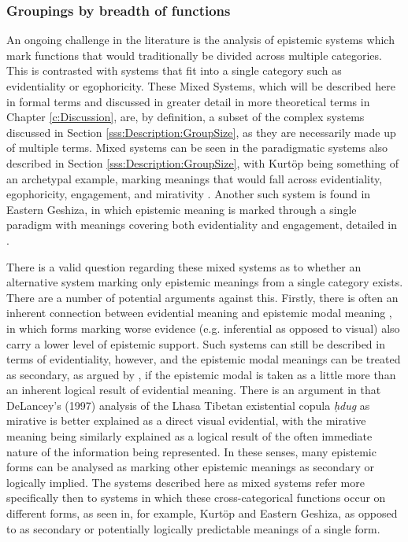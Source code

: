 \subsubsection{Groupings by breadth of functions}\label{sss:Description:MixedSystems}
An ongoing challenge in the literature is the analysis of epistemic systems which mark functions that would traditionally be divided across multiple categories. This is contrasted with systems that fit into a single category such as evidentiality or egophoricity. These Mixed Systems, which will be described here in formal terms and discussed in greater detail in more theoretical terms in Chapter \ref{c:Discussion}, are, by definition, a subset of the complex systems discussed in Section \ref{sss:Description:GroupSize}, as they are necessarily made up of multiple terms. Mixed systems can be seen in the paradigmatic systems also described in Section \ref{sss:Description:GroupSize}, with Kurtöp being something of an archetypal example, marking meanings that would fall across evidentiality, egophoricity, engagement, and mirativity \cite{Hyslop2020Kurtop}. Another such system is found in Eastern Geshiza, in which epistemic meaning is marked through a single paradigm with meanings covering both evidentiality and engagement, detailed in . 

There is a valid question regarding these mixed systems as to whether an alternative system marking only epistemic meanings from a single category exists. There are a number of potential arguments against this. Firstly, there is often an inherent connection between evidential meaning and epistemic modal meaning \cite{Boye2012}, in which forms marking worse evidence (e.g. inferential as opposed to visual) also carry a lower level of epistemic support. Such systems can still be described in terms of evidentiality, however, and the epistemic modal meanings can be treated as secondary, as argued by , if the epistemic modal is taken as a little more than an inherent logical result of evidential meaning. There is an argument in  that DeLancey's (1997) analysis of the Lhasa Tibetan existential copula \textit{ḥdug} as mirative is better explained as a direct visual evidential, with the mirative meaning being similarly explained as a logical result of the often immediate nature of the information being represented. In these senses, many epistemic forms can be analysed as marking other epistemic meanings as secondary or logically implied. The systems described here as mixed systems refer more specifically then to systems in which these cross-categorical functions occur on different forms, as seen in, for example, Kurtöp and Eastern Geshiza, as opposed to as secondary or potentially logically predictable meanings of a single form.

